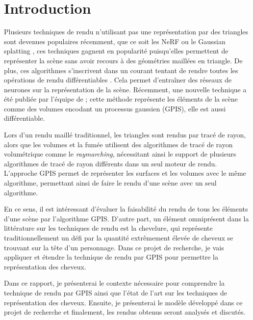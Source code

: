 \section{Introduction}
Plusieurs techniques de rendu n'utilisant pas une représentation par des triangles sont devenues populaires récemment, que ce soit les NeRF \cite{mildenhall2021nerf} ou le Gaussian splatting \cite{kerbl2023gaussian}, ces techniques gagnent en popularité puisqu'elles permettent de représenter la scène sans avoir recours à des géométries maillées en triangle. De plus, ces algorithmes s'inscrivent dans un courant tentant de rendre toutes les opérations de rendu différentiables \cite{kato2020differentiable}. Cela permet d'entraîner des réseaux de neurones sur la représentation de la scène. Récemment, une nouvelle technique a été publiée par l'équipe de \textcite{seyb24from} ; cette méthode représente les éléments de la scène comme des volumes encodant un processus gaussien (GPIS), elle est aussi différentiable.

Lors d'un rendu maillé traditionnel, les triangles sont rendus par tracé de rayon, alors que les volumes et la fumée utilisent des algorithmes de tracé de rayon volumétrique comme le \textit{raymarching}, nécessitant ainsi le support de plusieurs algorithmes de tracé de rayon différents dans un seul moteur de rendu. L'approche GPIS permet de représenter les surfaces et les volumes avec le même algorithme, permettant ainsi de faire le rendu d'une scène avec un seul algorithme.

En ce sens, il est intéressant d'évaluer la faisabilité du rendu de tous les éléments d'une scène par l'algorithme GPIS. D'autre part, un élément omniprésent dans la littérature sur les techniques de rendu est la chevelure, qui représente traditionnellement un défi par la quantité extrêmement élevée de cheveux se trouvant sur la tête d'un personnage. Dans ce projet de recherche, je vais appliquer et étendre la technique de rendu par GPIS pour permettre la représentation des cheveux.

Dans ce rapport, je présenterai le contexte nécessaire pour comprendre la technique de rendu par GPIS ainsi que l'état de l'art sur les techniques de représentation des cheveux. Ensuite, je présenterai le modèle développé dans ce projet de recherche et finalement, les rendus obtenus seront analysés et discutés.
